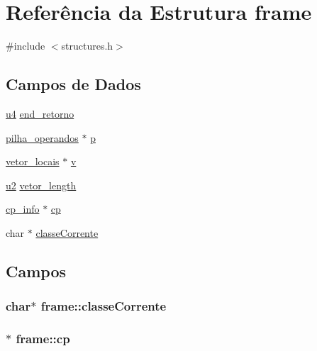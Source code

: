\hypertarget{structframe}{}\section{Referência da Estrutura frame}
\label{structframe}


{\ttfamily \#include $<$structures.\+h$>$}

\subsection*{Campos de Dados}
\begin{DoxyCompactItemize}
\item 
\hyperlink{lista__operandos_8h_ae5be1f726785414dd1b77d60df074c9d}{u4} \hyperlink{structframe_a5d2f3ff696847f4147ff799395a331fc}{end\+\_\+retorno}
\item 
\hyperlink{structpilha__operandos}{pilha\+\_\+operandos} $\ast$ \hyperlink{structframe_a6aa3e7c39989aa1477fd946643f521fe}{p}
\item 
\hyperlink{structvetor__locais}{vetor\+\_\+locais} $\ast$ \hyperlink{structframe_a01ae11b1517de21c420c3c9a6a267401}{v}
\item 
\hyperlink{lista__operandos_8h_a732cde1300aafb73b0ea6c2558a7a54f}{u2} \hyperlink{structframe_aec98a2c044409e921f45ac926ace588e}{vetor\+\_\+length}
\item 
\hyperlink{structcp__info}{cp\+\_\+info} $\ast$ \hyperlink{structframe_a93acb5bd67bf7dbfd2605c2d5c4c76c5}{cp}
\item 
char $\ast$ \hyperlink{structframe_a9c7ccb24c4cc2e9c8e17f1f5e9809211}{classe\+Corrente}
\end{DoxyCompactItemize}


\subsection{Campos}
\subsubsection[{\texorpdfstring{classe\+Corrente}{classeCorrente}}]{\setlength{\rightskip}{0pt plus 5cm}char$\ast$ frame\+::classe\+Corrente}\hypertarget{structframe_a9c7ccb24c4cc2e9c8e17f1f5e9809211}{}\label{structframe_a9c7ccb24c4cc2e9c8e17f1f5e9809211}
\subsubsection[{\texorpdfstring{cp}{cp}}]{$\ast$ frame\+::cp}\hypertarget{structframe_a93acb5bd67bf7dbfd2605c2d5c4c76c5}{}\label{structframe_a93acb5bd67bf7dbfd2605c2d5c4c76c5}

